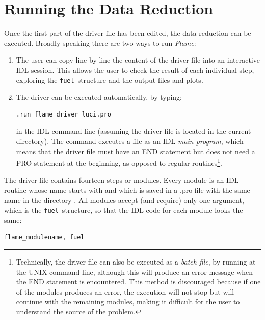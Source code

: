 \documentclass[a4paper]{article}
\newcommand{\flame}{\emph{Flame}}
\newcommand{\fuel}{\texttt{fuel}}
\begin{document}
\begin{sloppypar}



\section{Running the Data Reduction}
\label{sec:data_reduction}

Once the first part of the driver file has been edited, the data reduction can be executed. Broadly speaking there are two ways to run \flame:
\begin{enumerate}
\item The user can copy line-by-line the content of the driver file into an interactive IDL session. This allows the user to check the result of each individual step, exploring the \fuel\ structure and the output files and plots.

\item The driver can be executed automatically, by typing:
\begin{lstlisting}
.run flame_driver_luci.pro
\end{lstlisting}
in the IDL command line (assuming the driver file is located in the current directory). The  command executes a file as an IDL \emph{main program}, which means that the driver file must have an END statement but does not need a PRO statement at the beginning, as opposed to regular routines\footnote{Technically, the driver file can also be executed as a \emph{batch file}, by running  at the UNIX command line, although this will produce an error message when the END statement is encountered. This method is discouraged because if one of the modules produces an error, the execution will not stop but will continue with the remaining modules, making it difficult for the user to understand the source of the problem.}.
\end{enumerate}

The driver file contains fourteen steps or modules. Every module is an IDL routine whose name starts with  and which is saved in a .pro file with the same name in the directory . All modules accept (and require) only one argument, which is the \fuel\ structure, so that the IDL code for each module looks the same:
\begin{lstlisting}
flame_modulename, fuel
\end{lstlisting}


\end{sloppypar}
\end{document}
